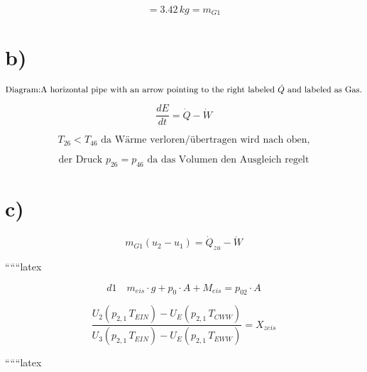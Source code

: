 \begin{equation*}
= 3.42 \, kg = m_{G1}
\end{equation*}

\section*{b)}

\begin{equation*}
\text{Diagram:} \\
\text{A horizontal pipe with an arrow pointing to the right labeled } \dot{Q} \text{ and labeled as } \text{Gas}. \\
\end{equation*}

\begin{equation*}
\frac{dE}{dt} = \dot{Q} - \dot{W}
\end{equation*}

\begin{equation*}
T_{26} < T_{46} \text{ da Wärme verloren/übertragen wird nach oben,}
\end{equation*}

\begin{equation*}
\text{der Druck } p_{26} = p_{46} \text{ da das Volumen den Ausgleich regelt}
\end{equation*}

\section*{c)}

\begin{equation*}
m_{G1} (u_2 - u_1) = \dot{Q}_{zu} - \dot{W}
\end{equation*}

``````latex

\begin{equation}
d1 \quad m_{eis} \cdot g + p_0 \cdot A + M_{eis} = p_{02} \cdot A
\end{equation}

\begin{equation}
\frac{U_2 \left( p_{2,1} \, T_{EIN} \right) - U_E \left( p_{2,1} \, T_{CWW} \right)}{U_3 \left( p_{2,1} \, T_{EIN} \right) - U_E \left( p_{2,1} \, T_{EWW} \right)} = X_{zeis}
\end{equation}

``````latex


